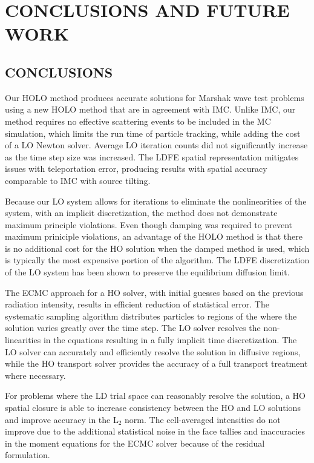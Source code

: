 \chapter{ \uppercase{Conclusions and Future Work} }
\label{chp:conclusions}

\section{CONCLUSIONS}

Our HOLO method produces accurate solutions for Marshak wave test problems using
a new HOLO method that are in agreement with IMC.  Unlike IMC, our method requires no effective scattering
events to be included in the MC simulation, which limits the run time of particle
tracking, while adding the cost of a LO Newton solver. Average LO iteration counts
did not significantly increase as the time step size was increased. The LDFE spatial representation
mitigates issues with teleportation error, producing results with spatial accuracy
comparable to IMC with source tilting. 

  Because our LO system allows for iterations
to eliminate the nonlinearities of the system, with an implicit discretization, the method does not demonstrate 
maximum principle violations. Even though damping was required to prevent maximum
priniciple violations, an advantage of the HOLO method is that
there is no additional cost for the HO solution when the damped method is used, which
is typically the most expensive portion of the algorithm.
 The LDFE discretization of the LO system has been shown to preserve the equilibrium
diffusion limit.

 The ECMC approach for a HO solver, with initial guesses based on the
previous radiation intensity, results in efficient reduction of statistical error.  The systematic sampling algorithm
distributes particles to regions of the where the solution varies greatly over the time step.
The LO solver resolves the non-linearities in the equations resulting in a fully
implicit time discretization.
The LO solver
can accurately and efficiently resolve the solution in diffusive regions, while the HO
transport solver provides the accuracy of a full transport treatment where necessary. 

For problems where the LD trial space can reasonably resolve the solution, a 
HO spatial closure is able to increase consistency between the HO and LO solutions and improve
accuracy in the L$_2$ norm.  The cell-averaged intensities do not improve due to the additional statistical noise
in the face tallies and inaccuracies in the moment equations for the ECMC solver because of the residual formulation.


